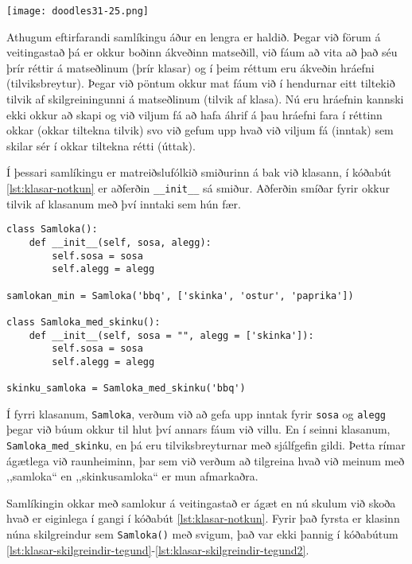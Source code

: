\phantom{easter egg}
\begin{center}
	\texttt{[image: doodles31-25.png]}
\end{center}

Athugum eftirfarandi samlíkingu áður en lengra er haldið.
Þegar við förum á veitingastað þá er okkur boðinn ákveðinn matseðill, við fáum að vita að það séu þrír réttir á matseðlinum (þrír klasar) og í þeim réttum eru ákveðin hráefni (tilviksbreytur).
Þegar við pöntum okkur mat fáum við í hendurnar eitt tiltekið tilvik af skilgreiningunni á matseðlinum (tilvik af klasa).
Nú eru hráefnin kannski ekki okkur að skapi og við viljum fá að hafa áhrif á þau hráefni fara í réttinn okkar (okkar tiltekna tilvik) svo við gefum upp hvað við viljum fá (inntak) sem skilar sér í okkar tiltekna rétti (úttak).

Í þessari samlíkingu er matreiðslufólkið smiðurinn á bak við klasann, í kóðabút \ref{lst:klasar-notkun} er aðferðin \texttt{\_\_init\_\_} sá smiður.
Aðferðin smíðar fyrir okkur tilvik af klasanum með því inntaki sem hún fær.

\begin{lstlisting}[caption=Klasar skilgreindir með töfraaðferðinni \_\_init\_\_, label=lst:klasar-notkun]
class Samloka():
	def __init__(self, sosa, alegg):
		self.sosa = sosa
		self.alegg = alegg
		
samlokan_min = Samloka('bbq', ['skinka', 'ostur', 'paprika'])

class Samloka_med_skinku():
	def __init__(self, sosa = "", alegg = ['skinka']):
		self.sosa = sosa
		self.alegg = alegg
		
skinku_samloka = Samloka_med_skinku('bbq')
\end{lstlisting}

Í fyrri klasanum, \texttt{Samloka}, verðum við að gefa upp inntak fyrir \texttt{sosa} og \texttt{alegg} þegar við búum okkur til hlut því annars fáum við villu.
En í seinni klasanum, \texttt{Samloka\_med\_skinku}, en þá eru tilviksbreyturnar með sjálfgefin gildi.
Þetta rímar ágætlega við raunheiminn, þar sem við verðum að tilgreina hvað við meinum með ,,samloka“ en ,,skinkusamloka“ er mun afmarkaðra.

Samlíkingin okkar með samlokur á veitingastað er ágæt en nú skulum við skoða hvað er eiginlega í gangi í kóðabút \ref{lst:klasar-notkun}.
Fyrir það fyrsta er klasinn núna skilgreindur sem \texttt{Samloka()} með svigum, það var ekki þannig í kóðabútum \ref{lst:klasar-skilgreindir-tegund}-\ref{lst:klasar-skilgreindir-tegund2}.

